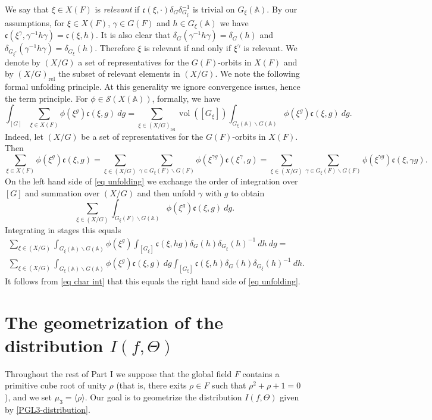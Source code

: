 \documentclass[12pt]{amsart}
\newcommand{\swrz}{\mathcal{S}}
\newcommand{\A}{\mathbb{A}}
\newcommand{\bs}{\backslash}
\newcommand{\vol}{\operatorname{vol}}
\newcommand{\rel}{{\operatorname{rel}}}
\renewcommand{\c}{\mathfrak{c}}
\theoremstyle{remark}
\begin{document}
We say that $\xi\in X(F)$ is \emph{relevant} if $\c(\xi,\cdot)\delta_G\delta_{G_\xi}^{-1}$ is trivial on $G_\xi(\A)$. 
By our assumptions, for $\xi\in X(F)$, $\gamma\in G(F)$ and $h\in G_\xi(\A)$ we have $\c(\xi^\gamma,\gamma^{-1}h\gamma)=\c(\xi, h)$. It is also clear that $\delta_G(\gamma^{-1}h\gamma)=\delta_G(h)$ and $\delta_{G_{\xi^\gamma}}(\gamma^{-1}h\gamma)=\delta_{G_\xi}(h)$. Therefore $\xi$ is relevant if and only if $\xi^\gamma$ is relevant. We denote by $(X/G)$ a set of representatives for the $G(F)$-orbits in $X(F)$ and by $(X/G)_\rel$ the subset of relevant elements in $(X/G)$. 
We note the following formal unfolding principle. At this generality we ignore convergence issues, hence the term principle. For $\phi\in \swrz(X(\A))$, formally, we have
\begin{equation}\label{eq unfolding}
\int_{[G]} \sum_{\xi\in X(F)} \phi(\xi^g) \c(\xi,g)\ dg =\sum_{\xi\in (X/G)_\rel} \vol([G_\xi]) \int_{G_\xi(\A)\bs G(\A)} \phi(\xi^g)\c(\xi,g)\ dg.
\end{equation}
Indeed, let $(X/G)$ be a set of representatives for the $G(F)$-orbits in $X(F)$. Then 
\[
\sum_{\xi\in X(F)} \phi(\xi^g) \c(\xi,g)=\sum_{\xi\in (X/G)}\sum_{\gamma\in G_\xi(F)\bs G(F)} \phi(\xi^{\gamma g}) \c(\xi^\gamma,g)=\sum_{\xi\in (X/G)}\sum_{\gamma\in G_\xi(F)\bs G(F)} \phi(\xi^{\gamma g}) \c(\xi,\gamma g).
\]
On the left hand side of \eqref{eq unfolding} we exchange the order of integration over $[G]$ and summation over $(X/G)$ and then unfold $\gamma$ with $g$ to obtain
\[
\sum_{\xi\in (X/G)} \int_{G_\xi(F)\bs G(\A)} \phi(\xi^g)\c(\xi,g)\ dg.
\]
Integrating in stages this equals
\begin{multline*}
\sum_{\xi\in (X/G)} \int_{G_\xi(\A)\bs G(\A)} \phi(\xi^g)   \int_{[G_\xi]}\c(\xi,hg)\delta_G(h) \delta_{G_\xi}(h)^{-1}\ dh\ dg=\\ \sum_{\xi\in (X/G)} \int_{G_\xi(\A)\bs G(\A)} \phi(\xi^g)\c(\xi,g) \ dg \int_{[G_\xi]}\c(\xi,h)\delta_G(h) \delta_{G_\xi}(h)^{-1} \ dh.
\end{multline*}
It follows from \eqref{eq char int} that this equals the right hand side of \eqref{eq unfolding}.




\section{The geometrization of the distribution \texorpdfstring{$I(f,\Theta)$}{I(f,theta)}}\label{sec-unfolding-I}

Throughout the rest of Part I we suppose that the global field $F$ contains a 
primitive cube root of unity $\rho$ (that is, there exits $\rho\in F$ such that $\rho^2+\rho+1=0$), and we set
$\mu_3=\langle\rho\rangle$.  Our goal is to geometrize the distribution $I(f,\Theta)$ given by \eqref{PGL3-distribution}.
\end{document}
